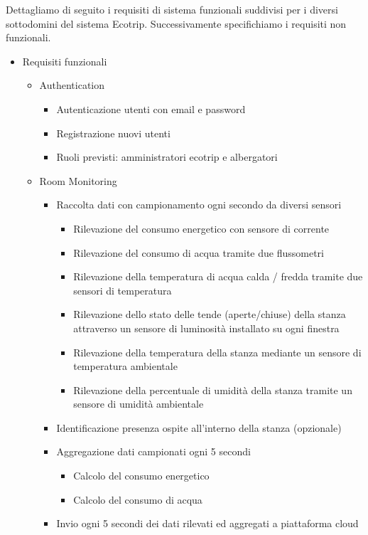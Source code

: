 Dettagliamo di seguito i requisiti di sistema funzionali suddivisi per i diversi sottodomini del sistema Ecotrip.
Successivamente specifichiamo i requisiti non funzionali.

\begin{itemize}
    \item Requisiti funzionali

    \begin{itemize}
        \item Authentication
        \begin{itemize}
            \item Autenticazione utenti con email e password
            \item Registrazione nuovi utenti
            \item Ruoli previsti: amministratori ecotrip e albergatori
        \end{itemize}
    \end{itemize}

    \begin{itemize}
        \item Room Monitoring
        \begin{itemize}
            \item Raccolta dati con campionamento ogni secondo da diversi sensori
            \begin{itemize}
                \item Rilevazione del consumo energetico con sensore di corrente
                \item Rilevazione del consumo di acqua tramite due flussometri
                \item Rilevazione della temperatura di acqua calda / fredda tramite due sensori di temperatura
                \item Rilevazione dello stato delle tende (aperte/chiuse) della stanza attraverso un sensore di luminosità installato su ogni finestra
                \item Rilevazione della temperatura della stanza mediante un sensore di temperatura ambientale
                \item Rilevazione della percentuale di umidità della stanza tramite un sensore di umidità ambientale
            \end{itemize}
            \item Identificazione presenza ospite all'interno della stanza (opzionale)
            \item Aggregazione dati campionati ogni 5 secondi
            \begin{itemize}
                \item Calcolo del consumo energetico
                \item Calcolo del consumo di acqua
            \end{itemize}
            \item Invio ogni 5 secondi dei dati rilevati ed aggregati a piattaforma cloud
        \end{itemize}
    \end{itemize}


\end{itemize}
